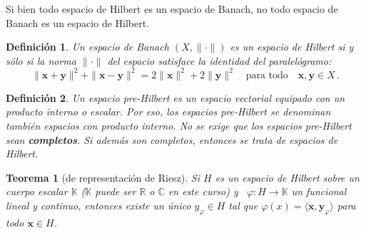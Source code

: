 \documentclass[12pt]{article}
\newtheorem*{myteo}{Teorema}
\newtheorem*{mydef}{Definición}
\begin{document}
Si bien todo espacio de Hilbert es un espacio de Banach, 
no todo espacio de Banach es un espacio de Hilbert.

\begin{mydef}
Un espacio de Banach $(X,\|\cdot\|)$ es un espacio de Hilbert
si y s\'olo si la norma $\|\cdot\|$ del espacio satisface la
identidad del paralel\'ogramo:
$$
\|\mathbf{x}+\mathbf{y}\|^2+\|\mathbf{x}-\mathbf{y}\|^2
= 2\|\mathbf{x}\|^2+2\|\mathbf{y}\|^2\quad
\text{para todo}\quad \mathbf{x},\mathbf{y}\in X\,.
$$
\end{mydef}

\begin{mydef}
Un espacio pre-Hilbert es un espacio vectorial equipado con un producto
interno o escalar.
Por eso, los espacios pre-Hilbert se denominan tambi\'en espacios con
producto interno.
No se exige que los espacios pre-Hilbert sean {\bf completos}.
Si adem\'as son completos, entonces se trata de espacios de Hilbert.
\end{mydef}






\begin{myteo}[de representación de Riesz]
Si $H$ es un espacio de Hilbert sobre un cuerpo escalar $\mathbb{K}$
($\mathbb{K}$ puede ser $\mathbb{R}$ o $\mathbb{C}$ en este curso)
y \ $\varphi: H \rightarrow \mathbb{K}$ un funcional lineal y continuo,
entonces existe un \'unico $y_{\varphi}\in H$ tal que
$\varphi(x)= \langle \mathbf{x},\mathbf{y}_{\varphi}\rangle$ para todo
$\mathbf{x}\in H$.
\end{myteo}
\end{document}
